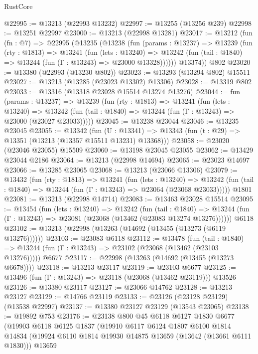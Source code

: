 \begin{lexlean}{RustCore}
\begin{coremodule}
@22995 := @13213 (@22993 @13232)
@22997 := @13255 (@13256 @239)
@22998 := @13251 @22997
@23000 := @13213 (@22998 @13281)
@23017 := @13212
    (fun (fn : @7) =>
    @22995
      (@13235
        (@13238
          (fun (params : @13237) =>
          @13239
            (fun (rty : @1813) =>
            @13241
              (fun (lets : @13240) =>
              @13242 (fun (tail : @1840) => @13244 (fun (Γ : @13243) => @23000 @13328))))))
        @13374))
    @802
@23020 := @13380 (@22993 (@13230 @802))
@23023 := @13293 (@13294 @802) @15511
@23027 := @13213 (@13285 (@23023 @13302) @13306)
@23028 := @13319 @802
@23033 := @13316 (@13318 @23028 @15514 @13274 @13276)
@23044 := fun (params : @13237) =>
  @13239
    (fun (rty : @1813) =>
    @13241
      (fun (lets : @13240) =>
      @13242 (fun (tail : @1840) => @13244 (fun (Γ : @13243) => @23000 (@23027 @23033)))))
@23045 := @13238 @23044
@23046 := @13235 @23045
@23055 := @13342
    (fun (U : @13341) => @13343 (fun (t : @29) => @13351 (@13213 (@13357 @15511 @13231) @13368)))
@23058 := @23020 (@23046 @23055) @15509
@23060 := @13198 @23045 @23055
@23062 := @13429 @23044 @2186
@23064 := @13213 (@22998 @14694)
@23065 := @23023 @14697
@23066 := @13285 @23065
@23068 := @13213 (@23066 @13306)
@23079 := @13432
    (fun (rty : @1813) =>
    @13241
      (fun (lets : @13240) =>
      @13242 (fun (tail : @1840) => @13244 (fun (Γ : @13243) => @23064 (@23068 @23033)))))
    @1801
@23081 := @13213 (@22998 @14714)
@23083 := @13463 @23028 @15514
@23095 := @13454
    (fun (lets : @13240) =>
    @13242
      (fun (tail : @1840) =>
      @13244 (fun (Γ : @13243) => @23081 (@23068 (@13462 (@23083 @13274 @13276))))))
    @6118
@23102 := @13213 (@22998 (@13263 (@14692 (@13455 (@13273 (@6119 @13276))))))
@23103 := @23083 @6118
@23112 := @13478
    (fun (tail : @1840) => @13244 (fun (Γ : @13243) => @23102 (@23068 (@13462 (@23103 @13276)))))
    @6677
@23117 := @22998 (@13263 (@14692 (@13455 (@13273 @6678))))
@23118 := @13213 @23117
@23119 := @23103 @6677
@23125 := @13496 (fun (Γ : @13243) => @23118 (@23068 (@13462 @23119))) @13526
@23126 := @13380 @23117
@23127 := @23066 @14762
@23128 := @13213 @23127
@23129 := @14766 @23119
@23133 := @23126 (@23128 @23129) (@13538 @22997)
@23137 := @13380 @23127 @23129 (@13543 @23065)
@23138 := @19892 @753
@23176 := @23138
    @800
    @45
    @6118
    @6127
    @1830
    @6677
    (@19903
      @6118
      @6125
      @1837
      (@19910
        @6117
        @6124
        @1807
        @6100
        @1814
        @14834
        (@19924 @6110 @1814 @19930 @14875 @13659 (@13642 (@13661 @6111 @1830)))
        @13659

\end{coremodule}
\end{lexlean}
